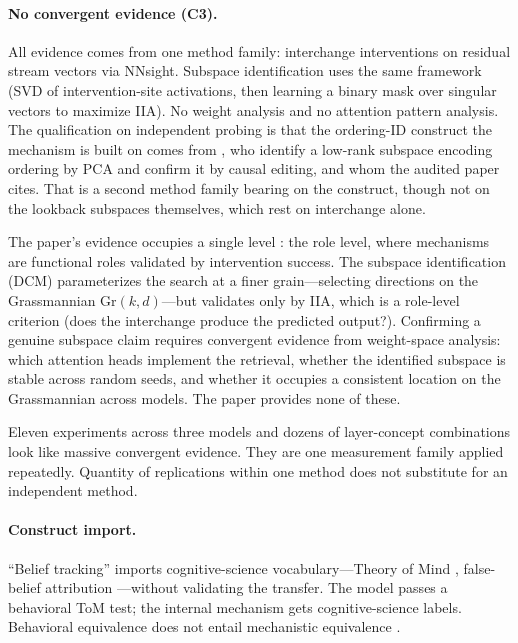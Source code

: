 \documentclass{article}
\begin{document}
\paragraph{No convergent evidence (C3).}
All evidence comes from one method family: interchange interventions on residual stream vectors via NNsight. Subspace identification uses the same framework (SVD of intervention-site activations, then learning a binary mask over singular vectors to maximize IIA). No weight analysis and no attention pattern analysis. The qualification on independent
probing is that the ordering-ID construct the mechanism is built on comes from
\citet{dai2024representational}, who identify a low-rank subspace encoding ordering by PCA
and confirm it by causal editing, and whom the audited paper cites. That is a second method
family bearing on the construct, though not on the lookback subspaces themselves, which rest
on interchange alone.

The paper's evidence occupies a single level \citep{tower2026mechviews}: the role level, where mechanisms are functional roles validated by intervention success. The subspace identification (DCM) parameterizes the search at a finer grain---selecting directions on the Grassmannian $\text{Gr}(k, d)$---but validates only by IIA, which is a role-level criterion (does the interchange produce the predicted output?). Confirming a genuine subspace claim requires convergent evidence from weight-space analysis: which attention heads implement the retrieval, whether the identified subspace is stable across random seeds, and whether it occupies a consistent location on the Grassmannian across models. The paper provides none of these.

Eleven experiments across three models and dozens of layer-concept combinations look like massive convergent evidence. They are one measurement family applied repeatedly. Quantity of replications within one method does not substitute for an independent method.

\paragraph{Construct import.}
``Belief tracking'' imports cognitive-science vocabulary---Theory of Mind \citep{premack1978chimpanzee}, false-belief attribution \citep{wimmer1983beliefs}---without validating the transfer. The model passes a behavioral ToM test; the internal mechanism gets cognitive-science labels. Behavioral equivalence does not entail mechanistic equivalence \citep{ruis2025reevaluating}.
\end{document}

